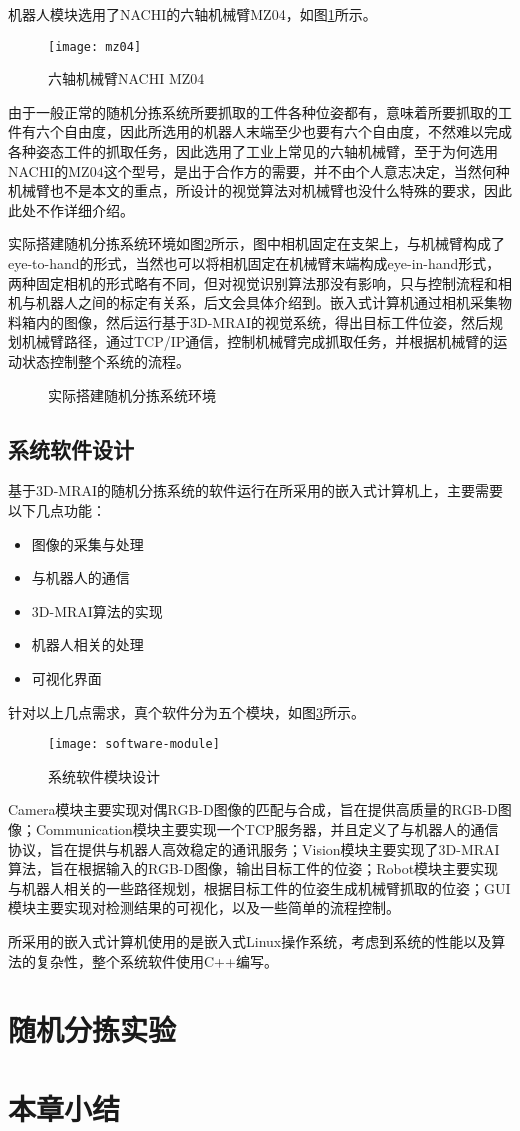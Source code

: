 机器人模块选用了NACHI的六轴机械臂MZ04，如图\ref{fig:mz04}所示。
\begin{figure}[ht]
  \centering
  \texttt{[image: mz04]}
  \caption{六轴机械臂NACHI MZ04}
  \label{fig:mz04}
\end{figure}
由于一般正常的随机分拣系统所要抓取的工件各种位姿都有，意味着所要抓取的工件有六个自由度，因此所选用的机器人末端至少也要有六个自由度，不然难以完成各种姿态工件的抓取任务，因此选用了工业上常见的六轴机械臂，至于为何选用NACHI的MZ04这个型号，是出于合作方的需要，并不由个人意志决定，当然何种机械臂也不是本文的重点，所设计的视觉算法对机械臂也没什么特殊的要求，因此此处不作详细介绍。

实际搭建随机分拣系统环境如图\ref{fig:bin-picking-env}所示，图中相机固定在支架上，与机械臂构成了eye-to-hand的形式，当然也可以将相机固定在机械臂末端构成eye-in-hand形式，两种固定相机的形式略有不同，但对视觉识别算法那没有影响，只与控制流程和相机与机器人之间的标定有关系，后文会具体介绍到。嵌入式计算机通过相机采集物料箱内的图像，然后运行基于3D-MRAI的视觉系统，得出目标工件位姿，然后规划机械臂路径，通过TCP/IP通信，控制机械臂完成抓取任务，并根据机械臂的运动状态控制整个系统的流程。
\begin{figure}[ht]
  \centering
  \caption{实际搭建随机分拣系统环境}
  \label{fig:bin-picking-env}
\end{figure}

\subsection{系统软件设计}
基于3D-MRAI的随机分拣系统的软件运行在所采用的嵌入式计算机上，主要需要以下几点功能：
\begin{itemize}
\item 图像的采集与处理
\item 与机器人的通信
\item 3D-MRAI算法的实现
\item 机器人相关的处理
\item 可视化界面
\end{itemize}
针对以上几点需求，真个软件分为五个模块，如图\ref{fig:software-module}所示。
\begin{figure}[ht]
  \centering
  \texttt{[image: software-module]}
  \caption{系统软件模块设计}
  \label{fig:software-module}
\end{figure}
Camera模块主要实现对偶RGB-D图像的匹配与合成，旨在提供高质量的RGB-D图像；Communication模块主要实现一个TCP服务器，并且定义了与机器人的通信协议，旨在提供与机器人高效稳定的通讯服务；Vision模块主要实现了3D-MRAI算法，旨在根据输入的RGB-D图像，输出目标工件的位姿；Robot模块主要实现与机器人相关的一些路径规划，根据目标工件的位姿生成机械臂抓取的位姿；GUI模块主要实现对检测结果的可视化，以及一些简单的流程控制。

所采用的嵌入式计算机使用的是嵌入式Linux操作系统，考虑到系统的性能以及算法的复杂性，整个系统软件使用C++编写。
\section{随机分拣实验}

\section{本章小结}

